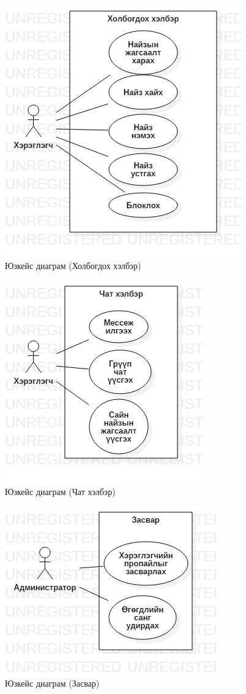 \begin{figure}[htbp]
	\centering
	\includegraphics[scale=0.4]{Diagrams/UseCaseContactForm}
	\caption[Юзкейс диаграм]{Юзкейс диаграм (Холбогдох хэлбэр)}
	\label{fit:UseCase}
\end{figure}
\begin{figure}[htbp]
	\centering
	\includegraphics[scale=0.4]{Diagrams/UseCaseChatForm}
	\caption[Юзкейс диаграм]{Юзкейс диаграм (Чат хэлбэр)}
	\label{fit:UseCase}
\end{figure}
\begin{figure}[htbp]
	\centering
	\includegraphics[scale=0.4]{Diagrams/UseCaseMaintenance}
	\caption[Юзкейс диаграм]{Юзкейс диаграм (Засвар)}
	\label{fit:UseCase}
\end{figure}
